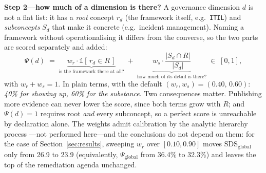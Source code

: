 \documentclass[engproc,proceedingpaper,submit,moreauthors]{Definitions/mdpi}
\begin{document}
\textbf{Step 2---how much of a dimension is there?} A governance dimension $d$ is not a flat list: it has a \emph{root} concept $r_d$ (the framework itself, e.g.\ \texttt{ITIL}) and \emph{subconcepts} $S_d$ that make it concrete (e.g.\ incident management). Naming a framework without operationalising it differs from the converse, so the two parts are scored separately and added:
\begin{equation}
\Psi(d) \;=\; \underbrace{w_r \cdot \mathbb{1}\!\left[\, r_d \in R \,\right]}_{\text{is the framework there at all?}} \;+\; \underbrace{w_s \cdot \frac{\lvert S_d \cap R \rvert}{\lvert S_d \rvert}}_{\text{how much of its detail is there?}}\;\in\;[0,1],
\label{eq:psi}
\end{equation}
with $w_r+w_s=1$. In plain terms, with the default $(w_r,w_s)=(0.40,\,0.60)$: \emph{40\% for showing up, 60\% for the substance}. Two consequences matter. Publishing more evidence can never lower the score, since both terms grow with $R$; and $\Psi(d)=1$ requires root \emph{and} every subconcept, so a perfect score is unreachable by declaration alone. The weights admit calibration by the analytic hierarchy process \cite{Saaty1990}---not performed here---and the conclusions do not depend on them: for the case of Section~\ref{sec:results}, sweeping $w_r$ over $[0.10,0.90]$ moves $\mathrm{SDS}_{\mathrm{global}}$ only from 26.9 to 23.9 (equivalently, $\Psi_{\mathrm{global}}$ from 36.4\% to 32.3\%) and leaves the top of the remediation agenda unchanged.
\end{document}
